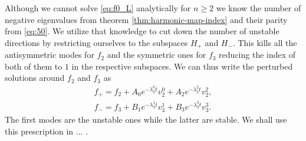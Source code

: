 Although we cannot solve \eqref{eq:f0_L} analytically for $n\ge2$ we
know the number of negative eigenvalues from theorem
\ref{thm:harmonic-map-index} and their parity from \eqref{eq:50}.  We
utilize that knowledge to cut down the number of unstable directions
by restricting ourselves to the subspaces $H_+$ and $H_-$. This kills
all the antisymmetric modes for $f_2$ and the symmetric ones for $f_3$
reducing the index of both of them to $1$ in the respective
subspaces. We can thus write the perturbed solutions around $f_2$ and
$f_3$ as
\begin{align}
  \label{eq:53}
  f_+=f_2+A_0e^{-\lambda_2^0t}v_2^0+A_2e^{-\lambda_2^2t}v_2^2,\\
  f_-=f_3+B_1e^{-\lambda_3^1t}v_3^1+B_3e^{-\lambda_3^3t}v_3^3.
\end{align}
The first modes are the unstable ones while the latter are stable. We
shall use this prescription in ... .


